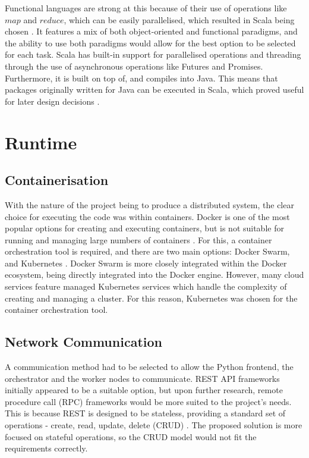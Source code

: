 Functional languages are strong at this because of their use of operations like $map$ and $reduce$, which can be easily parallelised, which resulted in Scala being chosen \cite{scaladocs}. It features a mix of both object-oriented and functional paradigms, and the ability to use both paradigms would allow for the best option to be selected for each task. Scala has built-in support for parallelised operations and threading through the use of asynchronous operations like Futures and Promises. Furthermore, it is built on top of, and compiles into Java. This means that packages originally written for Java can be executed in Scala, which proved useful for later design decisions \cite{scalaforjavadevs}.
 
\section{Runtime}
\subsection{Containerisation}
With the nature of the project being to produce a distributed system, the clear choice for executing the code was within containers. Docker is one of the most popular options for creating and executing containers, but is not suitable for running and managing large numbers of containers \cite{orchestrationdockerdocs}. For this, a container orchestration tool is required, and there are two main options: Docker Swarm, and Kubernetes \cite{dockerswarm, k8sapi}. Docker Swarm is more closely integrated within the Docker ecosystem, being directly integrated into the Docker engine. However, many cloud services feature managed Kubernetes services which handle the complexity of creating and managing a cluster. For this reason, Kubernetes was chosen for the container orchestration tool.

\subsection{Network Communication} 
A communication method had to be selected to allow the Python frontend, the orchestrator and the worker nodes to communicate. REST API frameworks initially appeared to be a suitable option, but upon further research, remote procedure call (RPC) frameworks would be more suited to the project's needs. This is because REST is designed to be stateless, providing a standard set of operations - create, read, update, delete (CRUD) \cite{masse2011rest}. The proposed solution is more focused on stateful operations, so the CRUD model would not fit the requirements correctly. 

